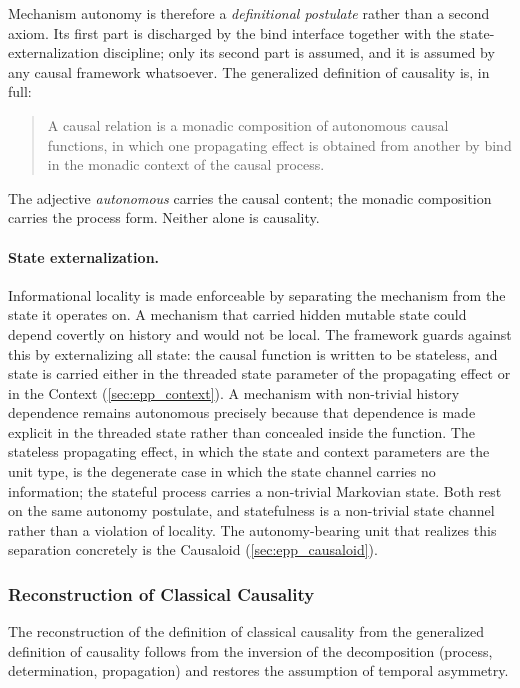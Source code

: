 Mechanism autonomy is therefore a \emph{definitional postulate} rather than a second axiom. Its first part is discharged by the bind interface together with the state-externalization discipline; only its second part is assumed, and it is assumed by any causal framework whatsoever. The generalized definition of causality is, in full:

\begin{quote}
A causal relation is a monadic composition of autonomous causal functions, in which one propagating effect is obtained from another by bind in the monadic context of the causal process.
\end{quote}

The adjective \emph{autonomous} carries the causal content; the monadic composition carries the process form. Neither alone is causality.

\paragraph{State externalization.}
Informational locality is made enforceable by separating the mechanism from the state it operates on. A mechanism that carried hidden mutable state could depend covertly on history and would not be local. The framework guards against this by externalizing all state: the causal function is written to be stateless, and state is carried either in the threaded state parameter of the propagating effect or in the Context (\ref{sec:epp_context}). A mechanism with non-trivial history dependence remains autonomous precisely because that dependence is made explicit in the threaded state rather than concealed inside the function. The stateless propagating effect, in which the state and context parameters are the unit type, is the degenerate case in which the state channel carries no information; the stateful process carries a non-trivial Markovian state. Both rest on the same autonomy postulate, and statefulness is a non-trivial state channel rather than a violation of locality. The autonomy-bearing unit that realizes this separation concretely is the Causaloid (\ref{sec:epp_causaloid}).

\newpage

\subsubsection{Reconstruction of Classical Causality}
\label{sub:epp_reconstruction}
 
 
 The reconstruction of the definition of classical causality from the generalized definition of causality follows from the inversion of the decomposition (process, determination, propagation) and restores the assumption of temporal asymmetry. 
 
